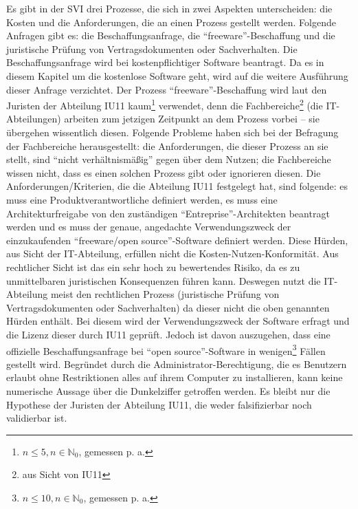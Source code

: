 Es gibt in der \ac{SVI} drei Prozesse, die sich in zwei Aspekten unterscheiden: die Kosten und die Anforderungen, die an einen Prozess gestellt werden. Folgende Anfragen gibt es: die Beschaffungsanfrage, die \enquote{freeware}-Beschaffung und die juristische Prüfung von Vertragsdokumenten oder Sachverhalten. Die Beschaffungsanfrage wird bei kostenpflichtiger Software beantragt. Da es in diesem Kapitel um die kostenlose Software geht, wird auf die weitere Ausführung dieser Anfrage verzichtet. Der Prozess \enquote{freeware}-Beschaffung wird laut den Juristen der Abteilung \ac{IU11} kaum\footnote{$ n \leq 5, n \in \mathbb{N}_{0} $, gemessen p. a.} verwendet, denn die Fachbereiche\footnote{aus Sicht von \ac{IU11}} (die IT-Abteilungen) arbeiten zum jetzigen Zeitpunkt an dem Prozess vorbei -- sie übergehen wissentlich diesen. Folgende Probleme haben sich bei der Befragung der Fachbereiche herausgestellt: die Anforderungen, die dieser Prozess an sie stellt, sind \enquote{nicht verhältnismäßig} gegen über dem Nutzen; die Fachbereiche wissen nicht, dass es einen solchen Prozess gibt oder ignorieren diesen. Die Anforderungen/Kriterien, die die Abteilung \ac{IU11} festgelegt hat, sind folgende: es muss eine Produktverantwortliche definiert werden, es muss eine Architekturfreigabe von den zuständigen \enquote{Entreprise}-Architekten beantragt werden und es muss der genaue, angedachte Verwendungszweck der einzukaufenden \enquote{freeware/open source}-Software definiert werden. Diese Hürden, aus Sicht der IT-Abteilung, erfüllen nicht die Kosten-Nutzen-Konformität. Aus rechtlicher Sicht ist das ein sehr hoch zu bewertendes Risiko, da es zu unmittelbaren juristischen Konsequenzen führen kann. Deswegen nutzt die IT-Abteilung meist den rechtlichen Prozess (juristische Prüfung von Vertragsdokumenten oder Sachverhalten) da dieser nicht die oben genannten Hürden enthält. Bei diesem wird der Verwendungszweck der Software erfragt und die Lizenz dieser durch \ac{IU11} geprüft. Jedoch ist davon auszugehen, dass eine offizielle Beschaffungsanfrage bei \enquote{open source}-Software in wenigen\footnote{$ n \leq 10, n \in \mathbb{N}_{0} $, gemessen p. a.} Fällen gestellt wird. Begründet durch die Administrator-Berechtigung, die es Benutzern erlaubt ohne Restriktionen alles auf ihrem Computer zu installieren, kann keine numerische Aussage über die Dunkelziffer getroffen werden. Es bleibt nur die Hypothese der Juristen der Abteilung \ac{IU11}, die weder falsifizierbar noch validierbar ist. 
\par
